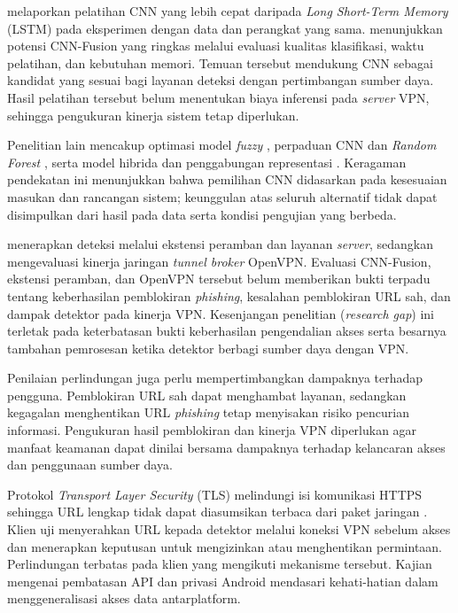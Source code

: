 \textcite{wei2020} melaporkan pelatihan CNN yang lebih cepat daripada \textit{Long Short-Term Memory} (LSTM) pada eksperimen dengan data dan perangkat yang sama. \textcite{hussain2023} menunjukkan potensi CNN-Fusion yang ringkas melalui evaluasi kualitas klasifikasi, waktu pelatihan, dan kebutuhan memori. Temuan tersebut mendukung CNN sebagai kandidat yang sesuai bagi layanan deteksi dengan pertimbangan sumber daya. Hasil pelatihan tersebut belum menentukan biaya inferensi pada \textit{server} VPN, sehingga pengukuran kinerja sistem tetap diperlukan.

Penelitian lain mencakup optimasi model \textit{fuzzy} \parencite{nordin2021}, perpaduan CNN dan \textit{Random Forest} \parencite{yang2021}, serta model hibrida dan penggabungan representasi \parencite{shaiba2022,subhashini2024,nanda2024,wangchuk2026}. Keragaman pendekatan ini menunjukkan bahwa pemilihan CNN didasarkan pada kesesuaian masukan dan rancangan sistem; keunggulan atas seluruh alternatif tidak dapat disimpulkan dari hasil pada data serta kondisi pengujian yang berbeda.

\textcite{minhlinh2024} menerapkan deteksi melalui ekstensi peramban dan layanan \textit{server}, sedangkan \textcite{munadi2019} mengevaluasi kinerja jaringan \textit{tunnel broker} OpenVPN. Evaluasi CNN-Fusion, ekstensi peramban, dan OpenVPN tersebut belum memberikan bukti terpadu tentang keberhasilan pemblokiran \textit{phishing}, kesalahan pemblokiran URL sah, dan dampak detektor pada kinerja VPN. Kesenjangan penelitian (\textit{research gap}) ini terletak pada keterbatasan bukti keberhasilan pengendalian akses serta besarnya tambahan pemrosesan ketika detektor berbagi sumber daya dengan VPN.

Penilaian perlindungan juga perlu mempertimbangkan dampaknya terhadap pengguna. Pemblokiran URL sah dapat menghambat layanan, sedangkan kegagalan menghentikan URL \textit{phishing} tetap menyisakan risiko pencurian informasi. Pengukuran hasil pemblokiran dan kinerja VPN diperlukan agar manfaat keamanan dapat dinilai bersama dampaknya terhadap kelancaran akses dan penggunaan sumber daya.

Protokol \textit{Transport Layer Security} (TLS) melindungi isi komunikasi HTTPS sehingga URL lengkap tidak dapat diasumsikan terbaca dari paket jaringan \parencite{rescorla2018}. Klien uji menyerahkan URL kepada detektor melalui koneksi VPN sebelum akses dan menerapkan keputusan untuk mengizinkan atau menghentikan permintaan. Perlindungan terbatas pada klien yang mengikuti mekanisme tersebut. Kajian \textcite{sikder2020} mengenai pembatasan API dan privasi Android mendasari kehati-hatian dalam menggeneralisasi akses data antarplatform.

